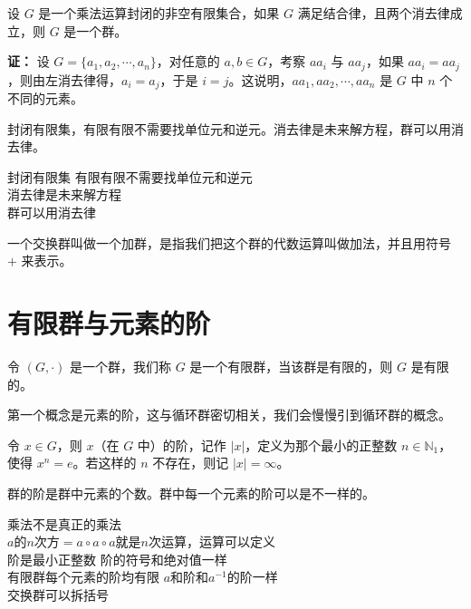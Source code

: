 \begin{theorem}[消去律与有限群判定]
设 $G$ 是一个乘法运算封闭的非空有限集合，如果 $G$ 满足结合律，且两个消去律成立，则 $G$ 是一个群。

\textbf{证：} 设 $G=\{a_1,a_2,\cdots,a_n\}$，对任意的 $a,b\in G$，考察 $aa_i$ 与 $aa_j$，如果 $aa_i=aa_j$，则由左消去律得，$a_i=a_j$，于是 $i=j$。这说明，$aa_1,aa_2,\cdots,aa_n$ 是 $G$ 中 $n$ 个不同的元素。

封闭有限集，有限有限不需要找单位元和逆元。消去律是未来解方程，群可以用消去律。
\end{theorem}

\begin{note}[消去律成立与证明G是一个群 重点]
封闭有限集 有限有限不需要找单位元和逆元 \\
消去律是未来解方程 \\
群可以用消去律
\end{note}

\begin{definition}[加群]
一个交换群叫做一个加群，是指我们把这个群的代数运算叫做加法，并且用符号 $+$ 来表示。
\end{definition}

\section{有限群与元素的阶}

\begin{definition}[有限群（定义 1.20）]
令 $(G,\cdot)$ 是一个群，我们称 $G$ 是一个有限群，当该群是有限的，则 $G$ 是有限的。

第一个概念是元素的阶，这与循环群密切相关，我们会慢慢引到循环群的概念。

令 $x\in G$，则 $x$（在 $G$ 中）的阶，记作 $|x|$，定义为那个最小的正整数 $n\in\mathbb{N}_1$，使得 $x^n=e$。若这样的 $n$ 不存在，则记 $|x|=\infty$。
\end{definition}

\begin{note}[群的阶与元素的阶]
群的阶是群中元素的个数。群中每一个元素的阶可以是不一样的。
\end{note}

\begin{note}[定义1 20元素的阶]
乘法不是真正的乘法 \\
$a$的$n$次方$=a\circ a\circ a$就是$n$次运算，运算可以定义 \\
阶是最小正整数 阶的符号和绝对值一样 \\
有限群每个元素的阶均有限 $a$和阶和$a^{-1}$的阶一样 \\
交换群可以拆括号
\end{note}

